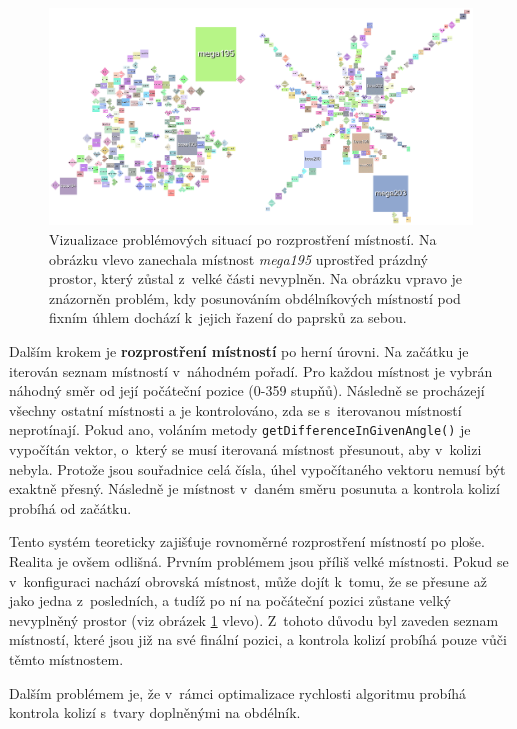 \par
\begin{figure}[hbt]
    \centering
    \includegraphics[width=1.0\textwidth]{obrazky/problemy_rozprostreni.png}
    \caption{Vizualizace problémových situací po rozprostření místností. Na obrázku vlevo zanechala místnost \textit{mega195} uprostřed prázdný prostor, který zůstal z~velké části nevyplněn. Na obrázku vpravo je znázorněn problém, kdy posunováním obdélníkových místností pod fixním úhlem dochází k~jejich řazení do paprsků za sebou.}
    \label{img:problemy_rozprostreni}
\end{figure}
Dalším krokem je \textbf{rozprostření místností} po herní úrovni.
Na začátku je iterován seznam místností v~náhodném pořadí.
Pro každou místnost je vybrán náhodný směr od její počáteční pozice (0-359 stupňů).
Následně se procházejí všechny ostatní místnosti a je kontrolováno, zda se s~iterovanou místností neprotínají.
Pokud ano, voláním metody \texttt{getDifferenceInGivenAngle()} je vypočítán vektor, o~který se musí iterovaná místnost přesunout, aby v~kolizi nebyla.
Protože jsou souřadnice celá čísla, úhel vypočítaného vektoru nemusí být exaktně přesný.
Následně je místnost v~daném směru posunuta a kontrola kolizí probíhá od začátku.
\par
Tento systém teoreticky zajišťuje rovnoměrné rozprostření místností po ploše.
Realita je ovšem odlišná.
Prvním problémem jsou příliš velké místnosti.
Pokud se v~konfiguraci nachází obrovská místnost, může dojít k~tomu, že se přesune až jako jedna z~posledních, a tudíž po ní na počáteční pozici zůstane velký nevyplněný prostor (viz obrázek \ref{img:problemy_rozprostreni} vlevo).
Z~tohoto důvodu byl zaveden seznam místností, které jsou již na své finální pozici, a kontrola kolizí probíhá pouze vůči těmto místnostem.
\par
Dalším problémem je, že v~rámci optimalizace rychlosti algoritmu probíhá kontrola kolizí s~tvary doplněnými na obdélník.
